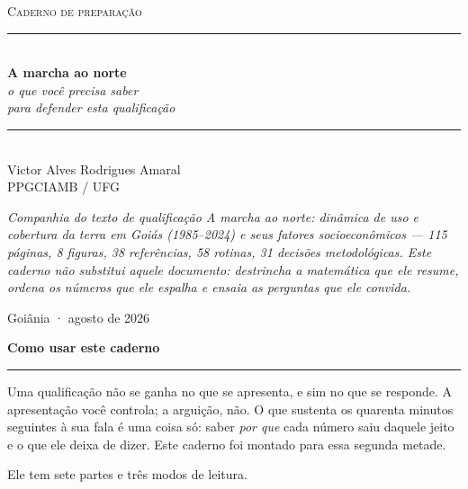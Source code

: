 \thispagestyle{empty}
\begin{center}
\vspace*{2.2cm}
{\color{corcerrado}\scshape\large Caderno de preparação}\\[3pt]
{\color{corregra}\rule{0.55\textwidth}{1pt}}\\[26pt]
{\color{cortinta}\Huge\bfseries A marcha ao norte}\\[14pt]
{\color{cortinta}\Large\itshape o que você precisa saber\\[4pt] para defender esta qualificação}\\[34pt]
{\color{corregra}\rule{0.35\textwidth}{0.6pt}}\\[22pt]
{\large Victor Alves Rodrigues Amaral}\\[6pt]
{\normalsize PPGCIAMB / UFG}\\[26pt]
\begin{minipage}{0.80\textwidth}
\small\itshape\color{cortinta}
Companhia do texto de qualificação \emph{A marcha ao norte: dinâmica de uso e
cobertura da terra em Goiás (1985--2024) e seus fatores socioeconômicos} ---
115 páginas, 8 figuras, 38 referências, 58 rotinas, 31 decisões metodológicas.
Este caderno não substitui aquele documento: destrincha a matemática que ele
resume, ordena os números que ele espalha e ensaia as perguntas que ele
convida.
\end{minipage}
\vfill
{\footnotesize\color{corcerrado}Goiânia · agosto de 2026}
\end{center}
\clearpage

\thispagestyle{empty}
\vspace*{0.6cm}
{\color{cortinta}\Large\bfseries Como usar este caderno}

\vspace{-4pt}
{\color{corregra}\rule{\textwidth}{1pt}}

\vspace{6pt}
Uma qualificação não se ganha no que se apresenta, e sim no que se responde. A
apresentação você controla; a arguição, não. O que sustenta os quarenta minutos
seguintes à sua fala é uma coisa só: saber \emph{por que} cada número saiu
daquele jeito e o que ele deixa de dizer. Este caderno foi montado para essa
segunda metade.

Ele tem sete partes e três modos de leitura.

